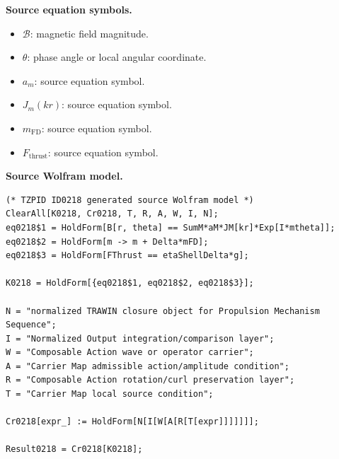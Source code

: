 \begin{minipage}[t]{0.49\linewidth}
\begingroup
\small
\raggedright
\textbf{Source equation symbols.}\par
\begin{itemize}[leftmargin=1.35em,itemsep=1pt,topsep=1pt,parsep=0pt]
    \item $\mathcal{B}$: magnetic field magnitude.
    \item $\theta$: phase angle or local angular coordinate.
    \item $a_m$: source equation symbol.
    \item $J_m(kr)$: source equation symbol.
    \item $m_{\mathrm{FD}}$: source equation symbol.
    \item $F_{\mathrm{thrust}}$: source equation symbol.
\end{itemize}
\endgroup
\end{minipage}\hfill
\begin{minipage}[t]{0.47\linewidth}
\begingroup
\scriptsize
\raggedright
\textbf{Source Wolfram model.}\par
\begin{Verbatim}[fontsize=\tiny,breaklines=true,breakanywhere=true]
(* TZPID ID0218 generated source Wolfram model *)
ClearAll[K0218, Cr0218, T, R, A, W, I, N];
eq0218$1 = HoldForm[B[r, theta] == SumM*aM*JM[kr]*Exp[I*mtheta]];
eq0218$2 = HoldForm[m -> m + Delta*mFD];
eq0218$3 = HoldForm[FThrust == etaShellDelta*g];

K0218 = HoldForm[{eq0218$1, eq0218$2, eq0218$3}];

N = "normalized TRAWIN closure object for Propulsion Mechanism Sequence";
I = "Normalized Output integration/comparison layer";
W = "Composable Action wave or operator carrier";
A = "Carrier Map admissible action/amplitude condition";
R = "Composable Action rotation/curl preservation layer";
T = "Carrier Map local source condition";

Cr0218[expr_] := HoldForm[N[I[W[A[R[T[expr]]]]]]];

Result0218 = Cr0218[K0218];
\end{Verbatim}
\endgroup
\end{minipage}

